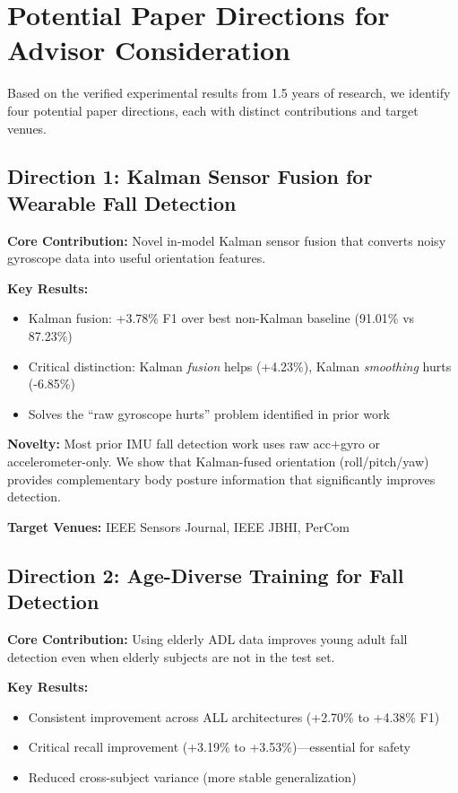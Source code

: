 \documentclass{article}
\begin{document}
\section{Potential Paper Directions for Advisor Consideration}

Based on the verified experimental results from 1.5 years of research, we identify four potential paper directions, each with distinct contributions and target venues.

\subsection{Direction 1: Kalman Sensor Fusion for Wearable Fall Detection}

\textbf{Core Contribution:} Novel in-model Kalman sensor fusion that converts noisy gyroscope data into useful orientation features.

\textbf{Key Results:}
\begin{itemize}
    \item Kalman fusion: +3.78\% F1 over best non-Kalman baseline (91.01\% vs 87.23\%)
    \item Critical distinction: Kalman \textit{fusion} helps (+4.23\%), Kalman \textit{smoothing} hurts (-6.85\%)
    \item Solves the ``raw gyroscope hurts'' problem identified in prior work
\end{itemize}

\textbf{Novelty:} Most prior IMU fall detection work uses raw acc+gyro or accelerometer-only. We show that Kalman-fused orientation (roll/pitch/yaw) provides complementary body posture information that significantly improves detection.

\textbf{Target Venues:} IEEE Sensors Journal, IEEE JBHI, PerCom

\subsection{Direction 2: Age-Diverse Training for Fall Detection}

\textbf{Core Contribution:} Using elderly ADL data improves young adult fall detection even when elderly subjects are not in the test set.

\textbf{Key Results:}
\begin{itemize}
    \item Consistent improvement across ALL architectures (+2.70\% to +4.38\% F1)
    \item Critical recall improvement (+3.19\% to +3.53\%)---essential for safety
    \item Reduced cross-subject variance (more stable generalization)
\end{itemize}
\end{document}
